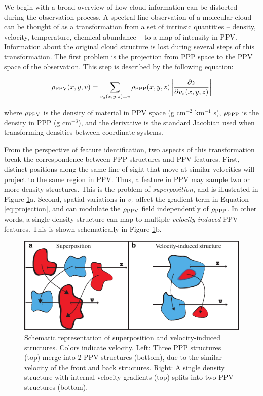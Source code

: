 We begin with
a broad overview of how cloud information can be distorted during the observation process.
A spectral line observation of a molecular cloud can be thought of as a
transformation from a set of intrinsic quantities  -- density, velocity,
temperature, chemical abundance --  to a map of intensity in PPV.
Information about the original cloud structure is lost during several
steps of this transformation. The first problem is the projection from
PPP space to the PPV space
of the observation. This step is described by the following equation:

\begin{equation}
\rho_{\rm PPV}(x, y, v) = \sum_{v_z(x, y, z) = v} \rho_{\rm PPP} (x, y, z) \left| \frac{\partial z}{\partial v_z(x, y, z)} \right|
\label{eq:projection}
\end{equation}

where $\rho_{\rm PPV}$ is the density of material in PPV space (g cm$^{-2}$ km$^{-1}$ s), $\rho_{\rm PPP}$ is the density in PPP (g cm$^{-3}$),
and the derivative is the standard Jacobian used when transforming densities between coordinate systems.

From the perspective of feature identification, two aspects of this transformation
break the correspondence between
PPP structures and PPV features. First, distinct positions along the
same line of sight that move at similar velocities will project to the
same region in PPV. Thus, a feature in PPV may sample
two or more density structures. This is the problem of \textit{superposition}, and is illustrated in Figure \ref{fig:schematic}a.
Second, spatial variations in $v_z$ affect
the gradient term in Equation \ref{eq:projection}, and can modulate the $\rho_{\rm PPV}$ field independently of $\rho_{\rm PPP}$.
In other words, a single density structure can map to multiple \textit{velocity-induced} PPV features. This is shown schematically
in Figure \ref{fig:schematic}b.

\begin{figure}[h!]
\includegraphics[width=5in]{figures/schematic}
\caption{Schematic representation of superposition and velocity-induced structures. Colors indicate velocity. Left: Three PPP structures (top) merge into 2 PPV structures (bottom), due to the similar velocity of the front and back structures. Right: A single density structure with internal velocity gradients (top) splits into two PPV structures (bottom).}
\label{fig:schematic}
\end{figure}

